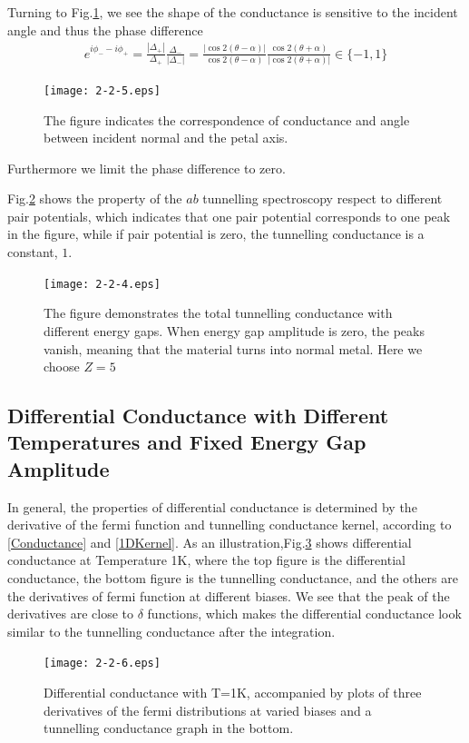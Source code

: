 Turning to Fig.\ref{fig:dc-alpha}, we see the shape of the conductance is sensitive to the incident angle and thus the phase difference 
\begin{eqnarray}\label{d wave phase difference}
e^{i\phi_--i\phi_+}=\frac{|\Delta_+|}{\Delta_+}\frac{\Delta_-}{|\Delta_-|}=\frac{|\cos2(\theta-\alpha)|}{\cos2(\theta-\alpha)}\frac{\cos2(\theta+\alpha)}{|\cos2(\theta+\alpha)|}\in\{-1,1\}
\end{eqnarray}

\begin{figure}[htbp]
\small
\centering
\texttt{[image: 2-2-5.eps]}
\caption{The figure indicates the correspondence of conductance and angle between incident normal and the petal axis.}
\label{fig:dc-alpha}
\end{figure}

Furthermore we limit the phase difference to zero. 

Fig.\ref{fig:dc-gap} shows the property of the $ab$ tunnelling spectroscopy respect to different pair potentials, which indicates that one pair potential corresponds to one peak in the figure, while if pair potential is zero, the tunnelling conductance is a constant, $1$.
\begin{figure}[htbp]
\small
\centering
\texttt{[image: 2-2-4.eps]}
\caption{The figure demonstrates the total tunnelling conductance with different
energy gaps. When energy gap amplitude is zero, the peaks vanish, meaning
that the material turns into normal metal. Here we choose $Z=5$}
\label{fig:dc-gap}
\end{figure}

\subsection{Differential Conductance with Different Temperatures and Fixed Energy Gap Amplitude}
In general, the properties of differential conductance is determined by the derivative of the fermi function and tunnelling conductance kernel, according to \eqref{Conductance} and \eqref{1DKernel}.
As an illustration,Fig.\ref{fig:fermi-dc} shows differential conductance at Temperature 1K, where the top figure is the differential conductance, the bottom figure is the tunnelling conductance, and the others are the derivatives of fermi function at different biases. We see that the peak of the derivatives are close to $\delta$ functions, which makes the differential conductance look similar to the tunnelling conductance after the integration.
\begin{figure}[htbp]
\small
\centering
\texttt{[image: 2-2-6.eps]}
\caption{Differential conductance with T=1K, accompanied by plots of three derivatives of the fermi distributions at varied biases and  a tunnelling conductance graph in the bottom.}
\label{fig:fermi-dc}
\end{figure}

